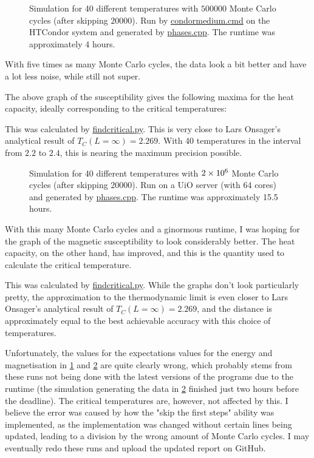 \documentclass[12pt,english,a4paper]{article}
\newcommand{\program}[1]{\href{https://github.com/anjohan/Offentlig/blob/master/FYS3150/Oblig4/#1}{#1}}
\begin{document}
\begin{figure}[H]
\centering

\caption{Simulation for 40 different temperatures with \(\num{500000}\) Monte Carlo cycles (after skipping \(\num{20000}\)). Run by \program{condormedium.cmd} on the HTCondor system and generated by \program{phases.cpp}. The runtime was approximately 4 hours.}\label{5e5}
\end{figure}
With five times as many Monte Carlo cycles, the data look a bit better and have a lot less noise, while still not super.

The above graph of the susceptibility gives the following maxima for the heat capacity, ideally corresponding to the critical temperatures:

This was calculated by \program{findcritical.py}. This is very close to Lars Onsager's analytical result of \(T_C(L=\infty)=\num{2.269}\). With 40 temperatures in the interval from \(\num{2.2}\) to \(\num{2.4}\), this is nearing the maximum precision possible.


\begin{figure}[H]
\centering

\caption{Simulation for 40 different temperatures with \(\num{2E6}\) Monte Carlo cycles (after skipping \(\num{20000}\)). Run on a UiO server (with 64 cores) and generated by \program{phases.cpp}. The runtime was approximately 15.5 hours.}\label{2e6}
\end{figure}
With this many Monte Carlo cycles and a ginormous runtime, I was hoping for the graph of the magnetic susceptibility to look considerably better. The heat capacity, on the other hand, has improved, and this is the quantity used to calculate the critical temperature.

This was calculated by \program{findcritical.py}. While the graphs don't look particularly pretty, the approximation to the thermodynamic limit is even closer to Lars Onsager's analytical result of \(T_C(L=\infty)=\num{2.269}\), and the distance is approximately equal to the best achievable accuracy with this choice of temperatures.

Unfortunately, the values for the expectations values for the energy and magnetisation in \ref{5e5} and \ref{2e6} are quite clearly wrong, which probably stems from these runs not being done with the latest versions of the programs due to the runtime (the simulation generating the data in \ref{2e6} finished just two hours before the deadline). The critical temperatures are, however, not affected by this. I believe the error was caused by how the "skip the first steps" ability was implemented, as the implementation was changed without certain lines being updated, leading to a division by the wrong amount of Monte Carlo cycles. I may eventually redo these runs and upload the updated report on GitHub.
\end{document}
